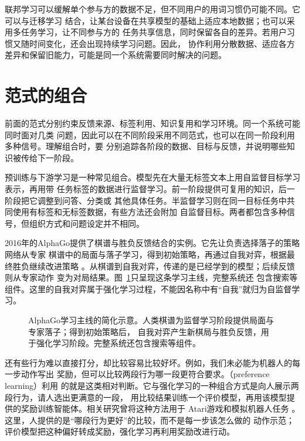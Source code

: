 联邦学习可以缓解单个参与方的数据不足，但不同用户的用词习惯仍可能不同。它可以与迁移学习
结合，让某台设备在共享模型的基础上适应本地数据；也可以采用多任务学习，让不同参与方的
任务共享信息，同时保留各自的差异。若用户习惯又随时间变化，还会出现持续学习问题。因此，
协作利用分散数据、适应各方差异和保留旧能力，可能是同一个系统需要同时解决的问题。

\section{范式的组合}
\label{sec:combining-learning-paradigms}

前面的范式分别约束反馈来源、标签利用、知识复用和学习环境。同一个系统可能同时面对几类
问题，因此可以在不同阶段采用不同范式，也可以在同一阶段利用多种信号。理解组合时，要
分别追踪各阶段的数据、目标与反馈，并说明哪些知识被传给下一阶段。

预训练与下游学习是一种常见组合。模型先在大量无标签文本上用自监督目标学习表示，再用带
任务标签的数据进行监督学习。前一阶段提供可复用的知识，后一阶段把它调整到问答、分类或
其他具体任务。半监督学习则在同一目标任务中共同使用有标签和无标签数据，有些方法还会附加
自监督目标。两者都包含多种信号，但组织方式和问题设定并不相同。

2016年的AlphaGo提供了棋谱与胜负反馈结合的实例。它先让负责选择落子的策略网络从专家
棋谱中的局面与落子学习，得到初始策略，再通过自我对弈，根据最终胜负继续改进策略
。从棋谱到自我对弈，传递的是已经学到的模型；后续反馈则从专家动作
变为对局结果。图~\ref{fig:paradigm-combination-alphago}只呈现这条学习主线，完整系统还
包含搜索等组件。这里的自我对弈属于强化学习过程，不能因名称中有“自我”就归为自监督学习。

\begin{figure}[!htb]
  \centering
  \caption{AlphaGo学习主线的简化示意。人类棋谱为监督学习阶段提供局面与专家落子；得到初始策略后，
  自我对弈产生新棋局与胜负反馈，用于强化学习阶段。完整系统还包含搜索等组件。}
  \label{fig:paradigm-combination-alphago}
\end{figure}
\FloatBarrier

还有些行为难以直接打分，却比较容易比较好坏。例如，我们未必能为机器人的每一步动作写出
奖励，但可以比较两段行为哪一段更符合要求。（preference learning）利用
的就是这类相对判断。它与强化学习的一种组合方式是向人展示两段行为，请人选出更满意的一段，
用比较结果训练一个评价模型，再用该模型提供的奖励训练智能体。相关研究曾将这种方法用于
Atari游戏和模拟机器人任务
。这里，人提供的是“哪段行为更好”的比较，而不是每一步该怎么做的
动作示范；评价模型把这种偏好转成奖励，强化学习再利用奖励改进行动。


